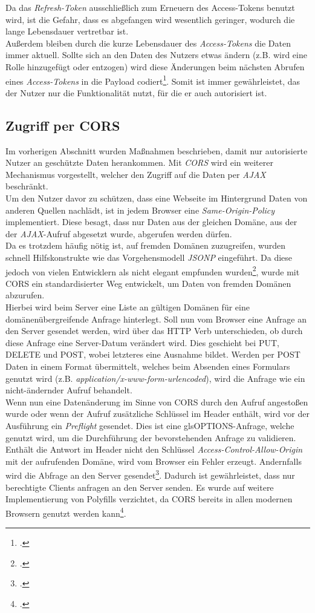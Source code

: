 Da das \textit{Refresh-Token} ausschließlich zum Erneuern des Access-Tokens benutzt wird, ist die Gefahr, dass es abgefangen wird wesentlich geringer, wodurch die lange Lebensdauer vertretbar ist. \\
Außerdem bleiben durch die kurze Lebensdauer des \textit{Access-Tokens} die Daten immer aktuell. Sollte sich an den Daten des Nutzers etwas ändern (z.B. wird eine Rolle hinzugefügt oder entzogen) wird diese Änderungen beim nächsten Abrufen eines \textit{Access-Tokens} in die Payload codiert\footcite{online:Implemented_OAuth_RefreshToken}. Somit ist immer gewährleistet, das der Nutzer nur die Funktionalität nutzt, für die er auch autorisiert ist. 
\subsection{Zugriff per CORS}
\label{ssec:cors}
Im vorherigen Abschnitt wurden Maßnahmen beschrieben, damit nur autorisierte Nutzer an geschützte Daten herankommen. Mit \textit{\ac{CORS}} wird ein weiterer Mechanismus vorgestellt, welcher den Zugriff auf die Daten per \textit{\ac{AJAX}} beschränkt. \\
Um den Nutzer davor zu schützen, dass eine Webseite im Hintergrund Daten von anderen Quellen nachlädt, ist in jedem Browser eine \textit{Same-Origin-Policy} implementiert. Diese besagt, dass nur Daten aus der gleichen Domäne, aus der der \textit{\ac{AJAX}}-Aufruf abgesetzt wurde, abgerufen werden dürfen. \\
Da es trotzdem häufig nötig ist, auf fremden Domänen zuzugreifen, wurden schnell Hilfskonstrukte wie das Vorgehensmodell \textit{\gls{JSONP}} eingeführt. Da diese jedoch von vielen Entwicklern als nicht elegant empfunden wurden\footcite[S. 102]{book:AngularJs:Steyer2015}, wurde mit \ac{CORS} ein standardisierter Weg entwickelt, um Daten von fremden Domänen abzurufen. \\
Hierbei wird beim Server eine Liste an gültigen Domänen für eine domänenübergreifende Anfrage hinterlegt. Soll nun vom Browser eine Anfrage an den Server gesendet werden, wird über das \ac{HTTP} Verb unterschieden, ob durch diese Anfrage eine Server-Datum verändert wird. Dies geschieht bei PUT, DELETE und POST, wobei letzteres eine Ausnahme bildet. Werden per POST Daten in einem Format übermittelt, welches beim Absenden eines Formulars genutzt wird (z.B. \textit{application/x-www-form-urlencoded}), wird die Anfrage wie ein nicht-ändernder Aufruf behandelt. \\
Wenn nun eine Datenänderung im Sinne von \ac{CORS} durch den Aufruf angestoßen wurde oder wenn der Aufruf zusätzliche Schlüssel im Header enthält, wird vor der Ausführung ein \textit{Preflight} gesendet. Dies ist eine gls{OPTIONS}-Anfrage, welche genutzt wird, um die Durchführung der bevorstehenden Anfrage zu validieren.
Enthält die Antwort im Header nicht den Schlüssel \textit{Access-Control-Allow-Origin} mit der aufrufenden Domäne, wird vom Browser ein Fehler erzeugt. Andernfalls wird die Abfrage an den Server gesendet\footcite[S. 102]{book:AngularJs:Steyer2015}. Dadurch ist gewährleistet, dass nur berechtigte Clients anfragen an den Server senden. Es wurde auf weitere Implementierung von \gls{Polyfills} verzichtet, da \ac{CORS} bereits in allen modernen Browsern genutzt werden kann\footcite{online:can-i-use:cors}.
